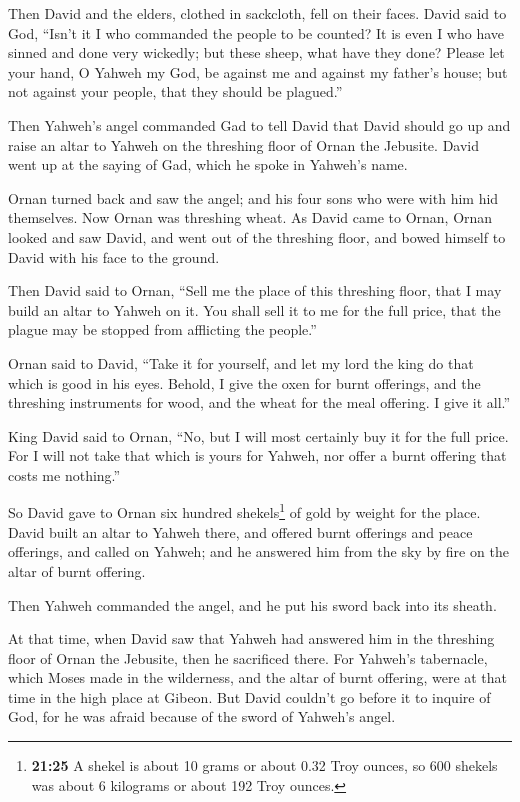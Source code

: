 Then David and the elders, clothed in sackcloth, fell on their faces.
 David said to God, ``Isn't it I who commanded the people
to be counted? It is even I who have sinned and done very wickedly; but
these sheep, what have they done? Please let your hand, O Yahweh my God,
be against me and against my father's house; but not against your
people, that they should be plagued.''

 Then Yahweh's angel commanded Gad to tell David that
David should go up and raise an altar to Yahweh on the threshing floor
of Ornan the Jebusite.  David went up at the saying of
Gad, which he spoke in Yahweh's name.

 Ornan turned back and saw the angel; and his four sons
who were with him hid themselves. Now Ornan was threshing wheat.
 As David came to Ornan, Ornan looked and saw David, and
went out of the threshing floor, and bowed himself to David with his
face to the ground.

 Then David said to Ornan, ``Sell me the place of this
threshing floor, that I may build an altar to Yahweh on it. You shall
sell it to me for the full price, that the plague may be stopped from
afflicting the people.''

 Ornan said to David, ``Take it for yourself, and let my
lord the king do that which is good in his eyes. Behold, I give the oxen
for burnt offerings, and the threshing instruments for wood, and the
wheat for the meal offering. I give it all.''

 King David said to Ornan, ``No, but I will most
certainly buy it for the full price. For I will not take that which is
yours for Yahweh, nor offer a burnt offering that costs me nothing.''

 So David gave to Ornan six hundred shekels\footnote{\textbf{21:25}
  A shekel is about 10 grams or about 0.32 Troy ounces, so 600 shekels
  was about 6 kilograms or about 192 Troy ounces.} of gold by weight for
the place.  David built an altar to Yahweh there, and
offered burnt offerings and peace offerings, and called on Yahweh; and
he answered him from the sky by fire on the altar of burnt offering.

 Then Yahweh commanded the angel, and he put his sword
back into its sheath.

 At that time, when David saw that Yahweh had answered
him in the threshing floor of Ornan the Jebusite, then he sacrificed
there.  For Yahweh's tabernacle, which Moses made in the
wilderness, and the altar of burnt offering, were at that time in the
high place at Gibeon.  But David couldn't go before it to
inquire of God, for he was afraid because of the sword of Yahweh's
angel.

